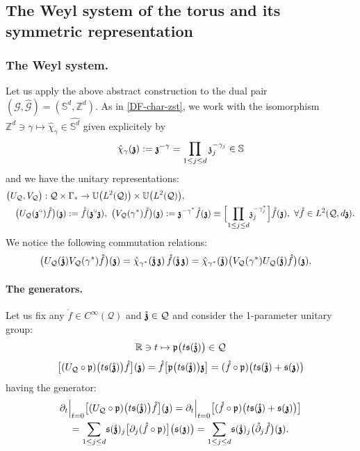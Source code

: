 \documentclass[12pt]{article}
\theoremstyle{definition}
\def\R{\mathbb{R}}
\def\Zd{\mathbb{Z}^d}
\def\T{\mathcal{Q}}
\def\p{\mathfrak{p}}
\def\s{\mathfrak{s}}
\def\bz{\mathfrak{z}\hspace*{-4pt}\mathfrak{z}}
\def\z{\mathfrak{z}}
\def\bigprod{{\text{\large{$\prod$}}}}
\def\beq{\begin{equation}}
\def\eeq{\end{equation}}
\def\z{\mathfrak{z}}
\def\Sd{\mathbb{S}^d}
\def\mbz{\mathring{\bz}}
\def\mf{\mathring{f}}
\numberwithin{equation}{section}
\begin{document}
\subsection{The Weyl system of the torus and its symmetric representation}

\subsubsection{The Weyl system.}
Let us apply the above abstract construction to the dual pair $ (\mathcal G, \widehat {\mathcal G})=(\Sd,\Zd)$.  As in \eqref{DF-char-zst}, we work with the isomorphism $\Zd\ni\gamma\mapsto\hat{\chi}_{\gamma}\in\widehat{\Sd}$ given explicitely by
\beq
\hat{\chi}_{\gamma}(\bz):=\bz^{-\gamma}=\underset{1\leq j\leq d}{\bigprod}\,\z_j^{-\gamma_j}\in\mathbb{S}
\eeq
and we have the unitary representations:
\begin{align}\label{DF-TW-syst}
	&\big(U_{\T},V_{\T}\big):\T\times\Gamma_*\rightarrow\mathbb{U}\big(L^2(\T)\big)\times\mathbb{U}\big(L^2(\T)\big),\\ \nonumber
	&\quad\big(U_{\T}(\bz^\circ)\mf\big)(\bz):=\mf(\bz^\circ\bz),\ \big(V_{\T}(\gamma^*)\mf\big)(\bz):=\bz^{-\gamma^*}{\mf}(\bz)\equiv\Big[\underset{1\leq j\leq d}{\prod}\z_j^{-\gamma^*_j}\Big]\mf(\bz),\  \forall\mf\in L^2(\T,d\bz).
\end{align}
We notice the following commutation relations:
\begin{align}
	\big(U_{\T}(\mbz)V_{\T}(\gamma^*)\mf\big)(\bz)&=\hat{\chi}_{\gamma^*}(\mbz\,\bz)\,\mf(\mbz\,\bz)=\hat{\chi}_{\gamma^*}(\mbz)\big(V_{\T}(\gamma^*)U_{\T}(\mbz)\mf\big)(\bz).
\end{align}

\paragraph{The generators.} Let us fix any $\mf\in{C}^\infty(\T)$ and $\mbz\in\T$ and consider the 1-parameter unitary group:
\beq
\R\ni{t}\mapsto\p\big(t\s(\mbz)\big)\in\T
\eeq
\beq
\big[(U_{\T}\circ\p)\big(t\s(\mbz)\big)\mf\big](\bz)=\mf\big[\p\big(t\s(\mbz)\big)\bz\big]=(\mf\circ\p)\big(t\s(\mbz)+\s(\bz)\big)
\eeq
having the generator:
\begin{align*}
&\partial_t\Big|_{t=0}\big[(U_{\T}\circ\p)\big(t\s(\mbz)\big)\mf\big](\bz)=\partial_t\Big|_{t=0}\big[(\mf\circ\p)\big(t\s(\mbz)+\s(\bz)\big)\big]\\
&\quad=\underset{1\leq j\leq d}{\sum}\s(\mbz)_j\big[\partial_j(\mf\circ\p)\big]\big(\s(\bz)\big)=\underset{1\leq j\leq d}{\sum}\s(\mbz)_j\big(\mathring{\partial}_j\mf\big)(\bz).
\end{align*}
\end{document}
